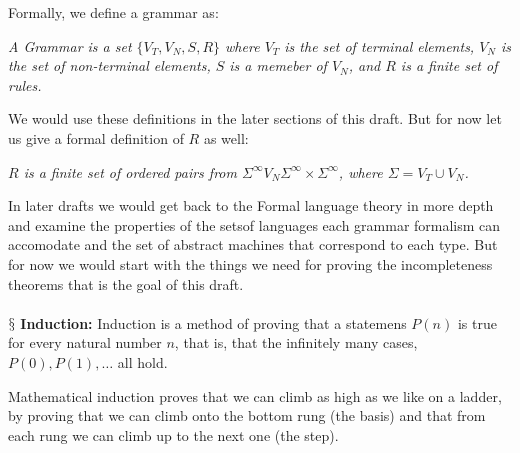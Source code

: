 \documentclass[10pt,a4paper]{article}
\newcounter{theo}
\newcommand{\newpoint}[1]{\indent$\mathsection$ \textbf{#1}}
\begin{document}
                    Formally, we define a grammar as:
                    \begin{define}
                        \textit{A Grammar is a set $\{V_T,V_N,S, R\}$ where $V_T$ is the set of terminal elements, $V_N$ is the set of non-terminal elements, $S$ is a memeber of $V_N$, and $R$ is a finite set of rules.}
                    \end{define}
                    We would use these definitions in the later sections of this draft. But for now let us give a formal definition of $R$ as well:
                    \begin{define}
                        \textit{$R$ is a finite set of ordered pairs from $\Sigma^\infty V_N \Sigma^\infty\times \Sigma^\infty$, where $\Sigma = V_T\cup V_N$.}
                    \end{define}
                    In later drafts we would get back to the Formal language theory in more depth and examine the properties of the setsof languages each grammar formalism can accomodate and the set of abstract machines that correspond to each type. But for now we would start with the things we need for proving the incompleteness theorems that is the goal of this draft.
                    \\
                    \\
                    \newpoint{Induction:} Induction is a method of proving that a statemens $P(n)$ is true for every natural number $n$, that is, that the infinitely many cases, $P(0), P(1),\dots$ all hold. \cite{enwiki:1157726892}
                    \begin{qt}
                        Mathematical induction proves that we can climb as high as we like on a ladder, by proving that we can climb onto the bottom rung (the basis) and that from each rung we can climb up to the next one (the step).
                    \end{qt}
\end{document}
